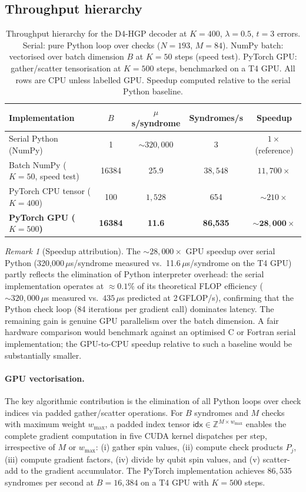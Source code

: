 \documentclass[12pt,a4paper]{article}
\theoremstyle{plain}
\theoremstyle{definition}
\theoremstyle{remark}
\newtheorem{remark}[theorem]{Remark}
\begin{document}
\subsection{Throughput hierarchy}

\begin{table}[ht]
\centering
\caption{Throughput hierarchy for the D4-HGP decoder at $K=400$, $\lambda=0.5$, $t=3$ errors.
  Serial: pure Python loop over checks ($N=193$, $M=84$).
  NumPy batch: vectorised over batch dimension $B$ at $K=50$ steps (speed test).
  PyTorch GPU: gather/scatter tensorisation at $K=500$ steps, benchmarked on a T4 GPU.
  All rows are CPU unless labelled GPU.
  Speedup computed relative to the serial Python baseline.}
\label{tab:throughput}
\small
\begin{tabular}{lcccc}
\toprule
Implementation & $B$ & $\mu$s/syndrome & Syndromes/s & Speedup \\
\midrule
Serial Python (NumPy) & 1 & $\sim 320{,}000$ & 3 & $1\times$ (reference) \\
Batch NumPy ($K=50$, speed test) & 16384 & 25.9 & $38{,}548$ & $11{,}700\times$ \\
PyTorch CPU tensor ($K=400$) & 100 & $1{,}528$ & 654 & $\sim 210\times$ \\
\textbf{PyTorch GPU ($K=500$)} & \textbf{16384} & \textbf{11.6} & \textbf{86{,}535} & $\bm{\sim 28{,}000\times}$ \\
\bottomrule
\end{tabular}
\end{table}

\begin{remark}[Speedup attribution]
The $\sim 28{,}000\times$ GPU speedup over serial Python (320{,}000\,$\mu$s/syndrome
measured vs.\ 11.6\,$\mu$s/syndrome on the T4 GPU) partly reflects
the elimination of Python interpreter overhead: the serial implementation
operates at $\approx 0.1\%$ of its theoretical FLOP efficiency
($\sim 320{,}000\,\mu$s measured vs.\ $435\,\mu$s predicted at 2\,GFLOP/s),
confirming that the Python check loop (84 iterations per gradient call)
dominates latency.
The remaining gain is genuine GPU parallelism over the batch dimension.
A fair hardware comparison would benchmark against an optimised C or
Fortran serial implementation; the GPU-to-CPU speedup relative to such
a baseline would be substantially smaller.
\end{remark}

\paragraph{GPU vectorisation.}
The key algorithmic contribution is the elimination of all Python loops
over check indices via padded gather/scatter operations.
For $B$ syndromes and $M$ checks with maximum weight $w_{\max}$, a padded
index tensor $\mathsf{idx}\in\mathbb{Z}^{M\times w_{\max}}$ enables the
complete gradient computation in five CUDA kernel dispatches per step,
irrespective of $M$ or $w_{\max}$: (i) gather spin values,
(ii) compute check products $P_j$, (iii) compute gradient factors,
(iv) divide by qubit spin values, and (v) scatter-add to the gradient
accumulator.
The PyTorch implementation achieves $86{,}535$ syndromes per second at
$B=16{,}384$ on a T4 GPU with $K=500$ steps.
\end{document}
